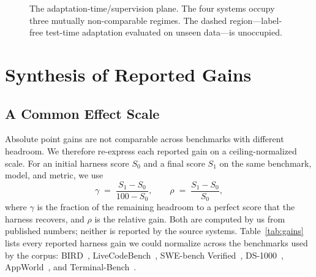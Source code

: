 \documentclass[conference]{IEEEtran}
\begin{document}
\begin{figure}[t]
\centering
{}
\caption{The adaptation-time/supervision plane. The four systems occupy three mutually non-comparable regimes. The dashed region---label-free test-time adaptation evaluated on unseen data---is unoccupied.}
\label{fig:adapt}
\end{figure}

\section{Synthesis of Reported Gains}
\label{sec:synthesis}

\subsection{A Common Effect Scale}

Absolute point gains are not comparable across benchmarks with different headroom. We therefore re-express each reported gain on a ceiling-normalized scale. For an initial harness score $S_0$ and a final score $S_1$ on the same benchmark, model, and metric, we use
\begin{equation}
\gamma \;=\; \frac{S_1 - S_0}{100 - S_0},
\qquad
\rho \;=\; \frac{S_1 - S_0}{S_0},
\end{equation}
where $\gamma$ is the fraction of the remaining headroom to a perfect score that the harness recovers, and $\rho$ is the relative gain. Both are computed by us from published numbers; neither is reported by the source systems. Table~\ref{tab:gains} lists every reported harness gain we could normalize across the benchmarks used by the corpus: BIRD~\cite{b14}, LiveCodeBench~\cite{b15}, SWE-bench Verified~\cite{b10}, DS-1000~\cite{b13}, AppWorld~\cite{b12}, and Terminal-Bench~\cite{b11}.
\end{document}

